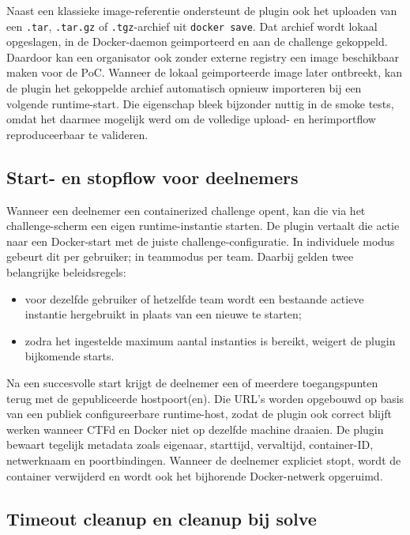 Naast een klassieke image-referentie ondersteunt de plugin ook het uploaden van een \texttt{.tar}, \texttt{.tar.gz} of \texttt{.tgz}-archief uit \texttt{docker save}. Dat archief wordt lokaal opgeslagen, in de Docker-daemon geimporteerd en aan de challenge gekoppeld. Daardoor kan een organisator ook zonder externe registry een image beschikbaar maken voor de PoC. Wanneer de lokaal geimporteerde image later ontbreekt, kan de plugin het gekoppelde archief automatisch opnieuw importeren bij een volgende runtime-start. Die eigenschap bleek bijzonder nuttig in de smoke tests, omdat het daarmee mogelijk werd om de volledige upload- en herimportflow reproduceerbaar te valideren.

\subsection{Start- en stopflow voor deelnemers}

Wanneer een deelnemer een containerized challenge opent, kan die via het challenge-scherm een eigen runtime-instantie starten. De plugin vertaalt die actie naar een Docker-start met de juiste challenge-configuratie. In individuele modus gebeurt dit per gebruiker; in teammodus per team. Daarbij gelden twee belangrijke beleidsregels:

\begin{itemize}
  \item voor dezelfde gebruiker of hetzelfde team wordt een bestaande actieve instantie hergebruikt in plaats van een nieuwe te starten;
  \item zodra het ingestelde maximum aantal instanties is bereikt, weigert de plugin bijkomende starts.
\end{itemize}

Na een succesvolle start krijgt de deelnemer een of meerdere toegangspunten terug met de gepubliceerde hostpoort(en). Die URL's worden opgebouwd op basis van een publiek configureerbare runtime-host, zodat de plugin ook correct blijft werken wanneer CTFd en Docker niet op dezelfde machine draaien. De plugin bewaart tegelijk metadata zoals eigenaar, starttijd, vervaltijd, container-ID, netwerknaam en poortbindingen. Wanneer de deelnemer expliciet stopt, wordt de container verwijderd en wordt ook het bijhorende Docker-netwerk opgeruimd.

\subsection{Timeout cleanup en cleanup bij solve}

